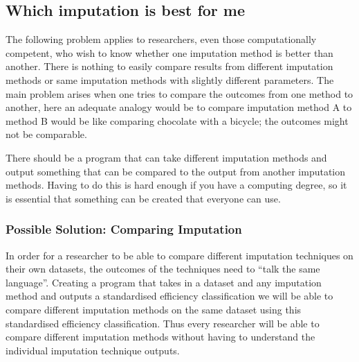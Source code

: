 \documentclass{IEEEconf}
\begin{document}
		\subsection{Which imputation is best for me} %
		\label{sub:which_imputation_is_best_for_me}
			The following problem applies to researchers, even those computationally competent, who wish to know whether one imputation method is better than another. There is nothing to easily compare results from different imputation methods or same imputation methods with slightly different parameters. The main problem arises when one tries to compare the outcomes from one method to another, here an adequate analogy would be to compare imputation method A to method B would be like comparing chocolate with a bicycle; the outcomes might not be comparable. 

			There should be a program that can take different imputation methods and output something that can be compared to the output from another imputation methods. Having to do this is hard enough if you have a computing degree, so it is essential that something can be created that everyone can use. 
			\subsubsection{Possible Solution: Comparing Imputation} %
			\label{sub:possible_solution}
				In order for a researcher to be able to compare different imputation techniques on their own datasets, the outcomes of the techniques need to ``talk the same language''. Creating a program that takes in a dataset and any imputation method and outputs a standardised efficiency classification we will be able to compare different imputation methods on the same dataset using this standardised efficiency classification. Thus every researcher will be able to compare different imputation methods without having to understand the individual imputation technique outputs.

 
\end{document}
